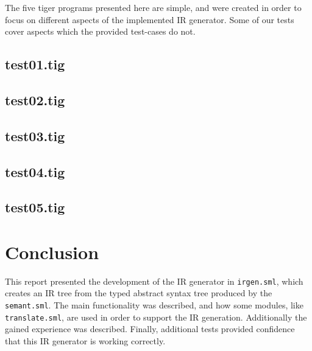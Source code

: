 \documentclass{article}
\begin{document}
The five tiger programs presented here are simple, and were created in order to focus on different aspects of the implemented IR generator. Some of our tests cover aspects which the provided test-cases do not.


\subsection{test01.tig}



\subsection{test02.tig}






\subsection{test03.tig}



\subsection{test04.tig}



\subsection{test05.tig}




\section{Conclusion}
This report presented the development of the IR generator in \texttt{irgen.sml}, which creates an IR tree from the typed abstract syntax tree produced by the \texttt{semant.sml}. The main functionality was described, and how some modules, like \texttt{translate.sml}, are used in order to support the IR generation. Additionally the gained experience was described. Finally, additional tests provided confidence that this IR generator is working correctly.
\end{document}
